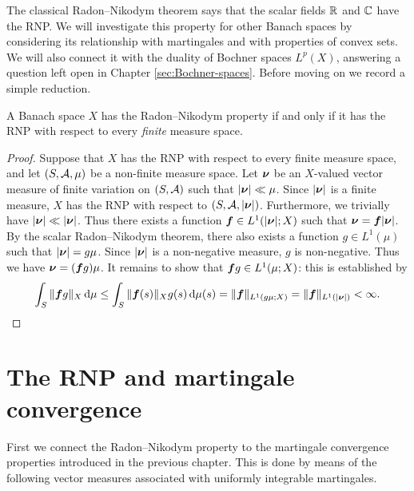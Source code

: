 The classical Radon--Nikodym theorem says that the scalar fields $\mathbb{R}$ and $\mathbb{C}$ have the RNP.
We will investigate this property for other Banach spaces by considering its relationship with martingales and with properties of convex sets.
We will also connect it with the duality of Bochner spaces $L^p(X)$, answering a question left open in Chapter \ref{sec:Bochner-spaces}.
Before moving on we record a simple reduction.

\begin{prop}\label{prop:RNP-finite-sufficient}
  A Banach space $X$ has the Radon--Nikodym property if and only if it has the RNP with respect to every \emph{finite} measure space.
\end{prop}

\begin{proof}
  Suppose that $X$ has the RNP with respect to every finite measure space, and let $(S,\mathcal{A},\mu)$ be a non-finite measure space.
  Let $\bm{\nu}$ be an $X$-valued vector measure of finite variation on $(S,\mathcal{A})$ such that $|\bm{\nu}| \ll \mu$.
  Since $|\bm{\nu}|$ is a finite measure, $X$ has the RNP with respect to $(S,\mathcal{A},|\bm{\nu}|)$.
  Furthermore, we trivially have $|\bm{\nu}| \ll |\bm{\nu}|$.
  Thus there exists a function $\bm{f} \in L^1(|\bm{\nu}|;X)$ such that $\bm{\nu} = \bm{f}|\bm{\nu}|$.
  By the scalar Radon--Nikodym theorem, there also exists a function $g \in L^1(\mu)$ such that $|\bm{\nu}| = g\mu$.
  Since $|\bm{\nu}|$ is a non-negative measure, $g$ is non-negative.
  Thus we have $\bm{\nu} = (\bm{f}g)\mu$.
  It remains to show that $\bm{f}g \in L^1(\mu;X)$: this is established by
  \begin{equation*}
    \int_{S} \|\bm{f}g\|_{X} \, \mathrm{d}\mu
    \leq \int_{S} \|\bm{f}(s)\|_{X} g(s) \, \mathrm{d}\mu(s) = \|\bm{f}\|_{L^1(g\mu;X)} = \|\bm{f}\|_{L^1(|\bm{\nu}|)} < \infty. 
  \end{equation*}
\end{proof}

\section{The RNP and martingale convergence}

First we connect the Radon--Nikodym property to the martingale convergence properties introduced in the previous chapter.
This is done by means of the following vector measures associated with uniformly integrable martingales.

